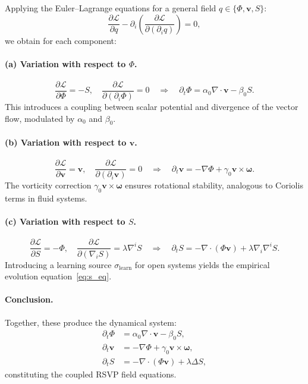 \documentclass[12pt]{book}
\theoremstyle{definition}
\begin{document}
Applying the Euler–Lagrange equations for a general field $q \in \{\Phi, \mathbf{v}, S\}$:
\begin{equation}
\frac{\partial \mathcal{L}}{\partial q} - \partial_i \!\left( \frac{\partial \mathcal{L}}{\partial (\partial_i q)} \right) = 0,
\end{equation}
we obtain for each component:

\paragraph{(a) Variation with respect to $\Phi$.}
\[
\frac{\partial \mathcal{L}}{\partial \Phi} = -S, \quad 
\frac{\partial \mathcal{L}}{\partial (\partial_i \Phi)} = 0
\quad \Rightarrow \quad
\partial_t \Phi = \alpha_0 \nabla \cdot \mathbf{v} - \beta_0 S.
\]
This introduces a coupling between scalar potential and divergence of the vector flow, modulated by $\alpha_0$ and $\beta_0$.

\paragraph{(b) Variation with respect to $\mathbf{v}$.}
\[
\frac{\partial \mathcal{L}}{\partial \mathbf{v}} = \mathbf{v}, \quad
\frac{\partial \mathcal{L}}{\partial (\partial_i \mathbf{v})} = 0
\quad \Rightarrow \quad
\partial_t \mathbf{v} = -\nabla \Phi + \gamma_0 \mathbf{v} \times \boldsymbol{\omega}.
\]
The vorticity correction $\gamma_0 \mathbf{v} \times \boldsymbol{\omega}$ ensures rotational stability, analogous to Coriolis terms in fluid systems.

\paragraph{(c) Variation with respect to $S$.}
\[
\frac{\partial \mathcal{L}}{\partial S} = -\Phi, \quad 
\frac{\partial \mathcal{L}}{\partial (\nabla_i S)} = \lambda \nabla^i S
\quad \Rightarrow \quad
\partial_t S = -\nabla \cdot (\Phi \mathbf{v}) + \lambda \nabla_i \nabla^i S.
\]
Introducing a learning source $\sigma_{\text{learn}}$ for open systems yields the empirical evolution equation~\eqref{eq:s_eq}.  

\paragraph{Conclusion.}
Together, these produce the dynamical system:
\begin{align}
\partial_t \Phi &= \alpha_0 \nabla \cdot \mathbf{v} - \beta_0 S,\\
\partial_t \mathbf{v} &= -\nabla \Phi + \gamma_0 \mathbf{v} \times \boldsymbol{\omega},\\
\partial_t S &= -\nabla \cdot (\Phi \mathbf{v}) + \lambda \Delta S,
\end{align}
constituting the coupled RSVP field equations.
\end{document}
